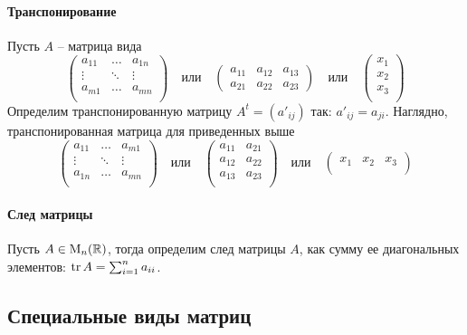 \paragraph{Транспонирование} Пусть $A$ -- матрица вида
\[
\begin{pmatrix}
{a_{11}}&{\ldots}&{a_{1n}}\\
{\vdots}&{\ddots}&{\vdots}\\
{a_{m1}}&{\ldots}&{a_{mn}}\\
\end{pmatrix}\quad \text{или}\quad
\begin{pmatrix}
{a_{11}}&{a_{12}}&{a_{13}}\\
{a_{21}}&{a_{22}}&{a_{23}}
\end{pmatrix}\quad \text{или}\quad
\begin{pmatrix}
{x_1}\\
{x_2}\\
{x_3}\\
\end{pmatrix}
\]
Определим транспонированную матрицу $A^t = (a'_{ij})$ так: $a'_{ij} = a_{ji}$. Наглядно, транспонированная матрица для приведенных выше
\[
\begin{pmatrix}
{a_{11}}&{\ldots}&{a_{m1}}\\
{\vdots}&{\ddots}&{\vdots}\\
{a_{1n}}&{\ldots}&{a_{mn}}\\
\end{pmatrix}\quad\text{или}\quad
\begin{pmatrix}
{a_{11}}&{a_{21}}\\
{a_{12}}&{a_{22}}\\
{a_{13}}&{a_{23}}\\
\end{pmatrix}\quad \text{или}\quad
\begin{pmatrix}
{x_1}&{x_2}&{x_3}\\
\end{pmatrix}
\]

\paragraph{След матрицы} Пусть $A\in\operatorname{M}_{n}(\mathbb R)$, тогда определим след матрицы $A$, как сумму ее диагональных элементов: $\operatorname{tr} A = \sum_{i=1}^n a_{ii}$.

\subsection{Специальные виды матриц}

